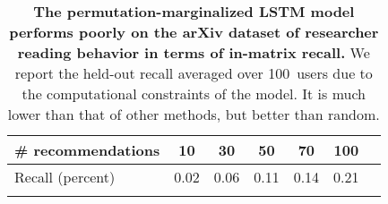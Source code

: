 \begin{table}[!h]
\centering
\begin{tabular}{lcccccc}
  \toprule
\# recommendations  & 10 & 30 & 50 & 70 & 100 \\
  \midrule
Recall (percent) & 0.02 & 0.06 & 0.11 & 0.14 & 0.21 \\
\bottomrule\\
\end{tabular}
\caption{\textbf{The permutation-marginalized LSTM model performs poorly on the
    arXiv dataset of researcher reading behavior in terms of in-matrix recall.}
  We report the held-out recall averaged over 100~users due to the computational
  constraints of the model. It is much lower than that of other methods, but
  better than random.}
\label{tab:lstm-arxiv}
\end{table}


